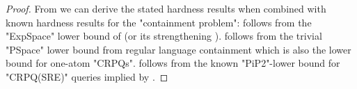 \begin{proof}
	From  we can derive the stated hardness results when combined with known hardness results for the "containment problem":
	 follows from the "ExpSpace" lower bound of \cite[Lemma 8]{Figueira2020Containment} (or its strengthening ).
%
	 follows from the trivial "PSpace" lower bound from regular language containment which is also the lower bound for one-atom "CRPQs".
%
	 follows from the known "PiP2"-lower bound for "CRPQ(SRE)" queries implied by \cite[Theorem 4.2]{FigueiraEtal2020Containment}.
\end{proof}